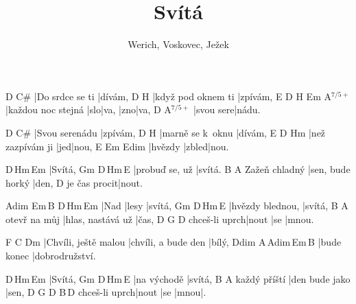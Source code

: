 \documentclass{song}
\title{Svítá}
\author{Werich, Voskovec, Ježek}
\newcommand{\aug}{$^{7/5+}$}
\begin{document}
\begin{multicols}{2}
\strophe
D               C\#\7
|Do srdce se ti |dívám,
D                  H\7
|když pod oknem ti |zpívám,
E\7                D   H\7  Em\7 A\aug
|každou noc stejná |slo|va, |zno|va,
D         A\aug
|svou sere|nádu.
\endstrophe

\strophe
D              C\#\7
|Svou serenádu |zpívám,
D                H\7
|marně se k~oknu |dívám,
E\7              D  Hm
|než zazpívám ji |jed|nou,
E\7     Em\7  Edim
|hvězdy |zbled|nou.
\endstrophe

\strophe
D\,Hm\,Em
|Svítá,
Gm             D\,Hm\,E\7
|probuď se, už |svítá.
              B\7              A\7
Zažeň chladný |sen, bude horký |den,
             D
je čas procit|nout.
\endstrophe

\columnbreak

\strophe
Adim Em\,B\7 D\,Hm\,Em
|Nad |lesy |svítá,
Gm               D\,Hm\,E\7
|hvězdy blednou, |svítá,
             B\7               A\7
otevř na můj |hlas, nastává už |čas,
              D     G\7 D
chceš-li uprch|nout |se |mnou.
\endstrophe

\strophe
F                   C                    Dm
|Chvíli, ještě malou |chvíli, a bude den |bílý,
Ddim        A\,Adim\,Em\,B\7
|bude konec |dobrodružství.
\endstrophe


\strophe
D\,Hm\,Em
|Svítá,
Gm          D\,Hm\,E\7
|na východě |svítá,
             B\7            A\7
každý příští |den bude jako |sen,
              D     G\7 D    B\7\,D
chceš-li uprch|nout |se |mnou|.
\endstrophe
\end{multicols}

\end{document}
